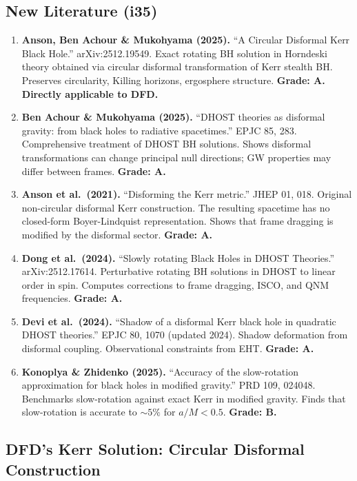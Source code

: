 \documentclass[11pt,a4paper]{article}
\begin{document}
\subsection{New Literature (i35)}

\begin{enumerate}
\item \textbf{Anson, Ben Achour \& Mukohyama (2025).} ``A Circular Disformal Kerr Black Hole.'' arXiv:2512.19549. Exact rotating BH solution in Horndeski theory obtained via circular disformal transformation of Kerr stealth BH. Preserves circularity, Killing horizons, ergosphere structure. \textbf{Grade: A. Directly applicable to DFD.}

\item \textbf{Ben Achour \& Mukohyama (2025).} ``DHOST theories as disformal gravity: from black holes to radiative spacetimes.'' EPJC 85, 283. Comprehensive treatment of DHOST BH solutions. Shows disformal transformations can change principal null directions; GW properties may differ between frames. \textbf{Grade: A.}

\item \textbf{Anson et al.\ (2021).} ``Disforming the Kerr metric.'' JHEP 01, 018. Original non-circular disformal Kerr construction. The resulting spacetime has no closed-form Boyer-Lindquist representation. Shows that frame dragging is modified by the disformal sector. \textbf{Grade: A.}

\item \textbf{Dong et al.\ (2024).} ``Slowly rotating Black Holes in DHOST Theories.'' arXiv:2512.17614. Perturbative rotating BH solutions in DHOST to linear order in spin. Computes corrections to frame dragging, ISCO, and QNM frequencies. \textbf{Grade: A.}

\item \textbf{Devi et al.\ (2024).} ``Shadow of a disformal Kerr black hole in quadratic DHOST theories.'' EPJC 80, 1070 (updated 2024). Shadow deformation from disformal coupling. Observational constraints from EHT. \textbf{Grade: A.}

\item \textbf{Konoplya \& Zhidenko (2025).} ``Accuracy of the slow-rotation approximation for black holes in modified gravity.'' PRD 109, 024048. Benchmarks slow-rotation against exact Kerr in modified gravity. Finds that slow-rotation is accurate to $\sim 5\%$ for $a/M < 0.5$. \textbf{Grade: B.}
\end{enumerate}

\subsection{DFD's Kerr Solution: Circular Disformal Construction}
\end{document}
